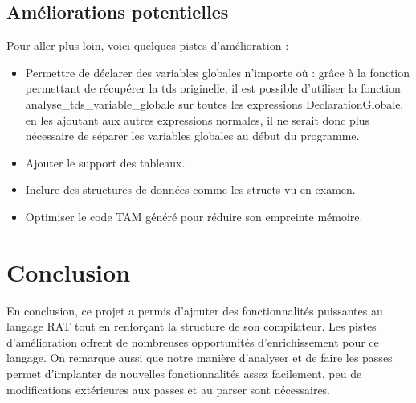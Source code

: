 \documentclass[a4paper,12pt]{article}
\begin{document}
\subsection{Am\'eliorations potentielles}
Pour aller plus loin, voici quelques pistes d'am\'elioration :
\begin{itemize}
    \item Permettre de déclarer des variables globales n'importe où : grâce à la fonction permettant de récupérer la tds originelle, il est possible d'utiliser la fonction analyse\_tds\_variable\_globale sur toutes les expressions DeclarationGlobale, en les ajoutant aux autres expressions normales, il ne serait donc plus nécessaire de séparer les variables globales au début du programme.
    \item Ajouter le support des tableaux.
    \item Inclure des structures de donn\'ees comme les structs vu en examen.
    \item Optimiser le code TAM g\'en\'er\'e pour r\'eduire son empreinte m\'emoire.
\end{itemize}

\section{Conclusion}
En conclusion, ce projet a permis d'ajouter des fonctionnalit\'es puissantes au langage RAT tout en renfor\c{c}ant la structure de son compilateur. Les pistes d'am\'elioration offrent de nombreuses opportunit\'es d'enrichissement pour ce langage.
On remarque aussi que notre manière d'analyser et de faire les passes permet d'implanter de nouvelles fonctionnalités assez facilement, peu de modifications extérieures aux passes et au parser sont nécessaires. 
\end{document}
